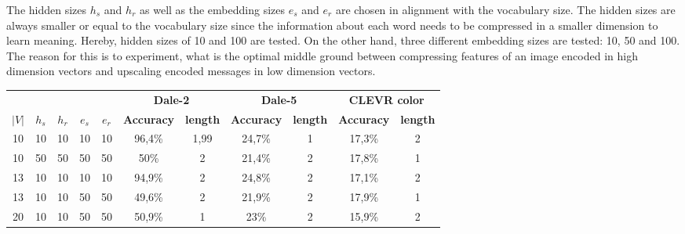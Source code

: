 The hidden sizes $h_s$ and $h_r$ as well as the embedding sizes $e_s$ and $e_r$ are chosen in alignment with the vocabulary size.
The hidden sizes are always smaller or equal to the vocabulary size since the information about each word needs to be compressed in a smaller dimension to learn meaning.
Hereby, hidden sizes of 10 and 100 are tested.
On the other hand, three different embedding sizes are tested: 10, 50 and 100.
The reason for this is to experiment, what is the optimal middle ground between compressing features of an image encoded in high dimension vectors and upscaling encoded messages in low dimension vectors.

\begin{table}[h]
    \centering
    \begin{tabular}{ccccc|cc|cc|cc}
        \toprule
              &         &         &         &         & \multicolumn{2}{c}{\textbf{Dale-2}} & \multicolumn{2}{c}{\textbf{Dale-5}} & \multicolumn{2}{c}{\textbf{CLEVR color}}                                                         \\\cmidrule(lr){6-7}\cmidrule(lr){8-9}\cmidrule(lr){10-11}
        $|V|$ & $h_{s}$ & $h_{r}$ & $e_{s}$ & $e_{r}$ & \textbf{Accuracy}                   & \textbf{length}                     & \textbf{Accuracy}                        & \textbf{length} & \textbf{Accuracy} & \textbf{length} \\\midrule
        {10}  & {10}    & {10}    & {10}    & {10}    & {96,4\%}                            & {1,99}                              & {24,7\%}                                 & {1}             & {17,3\%}          & {2}             \\
        {10}  & {50}    & {50}    & {50}    & {50}    & {50\%}                              & {2}                                 & {21,4\%}                                 & {2}             & {17,8\%}          & {1}             \\
        {13}  & {10}    & {10}    & {10}    & {10}    & {94,9\%}                            & {2}                                 & {24,8\%}                                 & {2}             & {17,1\%}          & {2}             \\
        {13}  & {10}    & {10}    & {50}    & {50}    & {49,6\%}                            & {2}                                 & {21,9\%}                                 & {2}             & {17,9\%}          & {1}             \\
        {20}  & {10}    & {10}    & {50}    & {50}    & {50,9\%}                            & {1}                                 & {23\%}                                   & {2}             & {15,9\%}          & {2}             \\

\end{tabular}
\end{table}
